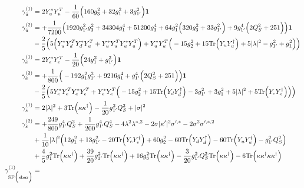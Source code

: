 {\begin{align}
\gamma_{\hat{u}}^{(1)} & =  
2 {Y_u^*  Y_{u}^{T}}  -\frac{1}{60} \Big(160 g_{3}^{2}  + 32 g_{1}^{2}  + 3 g_{1'}^{2} \Big){\bf 1} \\ 
\gamma_{\hat{u}}^{(2)} & =  
+\frac{1}{7200} \Big(1920 g_{1'}^{2} g_{3}^{2}  + 34304 g_{1}^{4}  + 51200 g_{3}^{4}  + 64 g_{1}^{2} \Big(320 g_{3}^{2}  + 33 g_{1'}^{2} \Big) + 9 g_{1'}^{4} \Big(2 Q_{S}^{2}  + 251\Big)\Big){\bf 1} \nonumber \\ 
 &-\frac{2}{5} \Big(5 \Big({Y_u^*  Y_{d}^{T}  Y_d^*  Y_{u}^{T}} + {Y_u^*  Y_{u}^{T}  Y_u^*  Y_{u}^{T}}\Big) + {Y_u^*  Y_{u}^{T}} \Big(-15 g_{2}^{2}  + 15 \mbox{Tr}\Big({Y_u  Y_{u}^{\dagger}}\Big)  + 5 |\lambda|^2  - g_{1'}^{2}  + g_{1}^{2}\Big)\Big)\\ 
\gamma_{\hat{e}}^{(1)} & =  
2 {Y_e^*  Y_{e}^{T}}  -\frac{1}{20} \Big(24 g_{1}^{2}  + g_{1'}^{2}\Big){\bf 1} \\ 
\gamma_{\hat{e}}^{(2)} & =  
+\frac{1}{800} \Big(-192 g_{1}^{2} g_{1'}^{2}  + 9216 g_{1}^{4}  + g_{1'}^{4} \Big(2 Q_{S}^{2}  + 251\Big)\Big){\bf 1} \nonumber \\ 
 &-\frac{2}{5} \Big(5 {Y_e^*  Y_{e}^{T}  Y_e^*  Y_{e}^{T}}  + {Y_e^*  Y_{e}^{T}} \Big(-15 g_{2}^{2}  + 15 \mbox{Tr}\Big({Y_d  Y_{d}^{\dagger}}\Big)  -3 g_{1'}^{2}  + 3 g_{1}^{2}  + 5 |\lambda|^2  + 5 \mbox{Tr}\Big({Y_e  Y_{e}^{\dagger}}\Big) \Big)\Big)\\ 
\gamma_{\hat{s}}^{(1)} & =  
2 |\lambda|^2  + 3 \mbox{Tr}\Big({\kappa  \kappa^{\dagger}}\Big)  -\frac{1}{20} g_{1'}^{2} Q_{S}^{2}  + |\sigma|^2\\ 
\gamma_{\hat{s}}^{(2)} & =  
+\frac{249}{800} g_{1'}^{4} Q_{S}^{2} +\frac{1}{200} g_{1'}^{4} Q_{S}^{4} -4 \lambda^{2} \lambda^{*,2} -2 \sigma |\kappa^\prime|^2 \sigma^{\prime,*} -2 \sigma^{2} \sigma^{\prime,*,2} \nonumber \\ 
 &+\frac{1}{10} |\lambda|^2 \Big(12 g_{1}^{2}  + 13 g_{1'}^{2}  -20 \mbox{Tr}\Big({Y_e  Y_{e}^{\dagger}}\Big)  + 60 g_{2}^{2}  -60 \mbox{Tr}\Big({Y_d  Y_{d}^{\dagger}}\Big)  -60 \mbox{Tr}\Big({Y_u  Y_{u}^{\dagger}}\Big)  - g_{1'}^{2} Q_{S}^{2} \Big)\nonumber \\ 
 &+\frac{4}{5} g_{1}^{2} \mbox{Tr}\Big({\kappa  \kappa^{\dagger}}\Big) +\frac{39}{20} g_{1'}^{2} \mbox{Tr}\Big({\kappa  \kappa^{\dagger}}\Big) +16 g_{3}^{2} \mbox{Tr}\Big({\kappa  \kappa^{\dagger}}\Big) -\frac{3}{20} g_{1'}^{2} Q_{S}^{2} \mbox{Tr}\Big({\kappa  \kappa^{\dagger}}\Big) -6 \mbox{Tr}\Big({\kappa  \kappa^{\dagger}  \kappa  \kappa^{\dagger}}\Big) \\ 
\gamma_{\text{SF}\Big(\text{sbar}\Big)}^{(1)} & =  

\end{align}}
